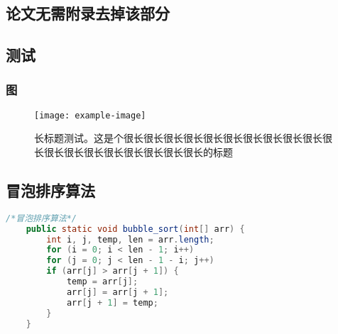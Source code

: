 \begin{appendix}

\chapter{论文无需附录去掉该部分}
\section{测试}
\subsection{图}
\begin{figure}[H]
	\centering
	\texttt{[image: example-image]}
	\caption{长标题测试。这是个很长很长很长很长很长很长很长很长很长很长很长很长很长很长很长很长很长很长很长的标题}
\end{figure}
\section{冒泡排序算法}
\begin{lstlisting}[language=Java]
	/*冒泡排序算法*/ 
	public static void bubble_sort(int[] arr) {
		int i, j, temp, len = arr.length;
		for (i = 0; i < len - 1; i++)
		for (j = 0; j < len - 1 - i; j++) 
		if (arr[j] > arr[j + 1]) {
			temp = arr[j];
			arr[j] = arr[j + 1];
			arr[j + 1] = temp;
		}
	}
\end{lstlisting}



\end{appendix}